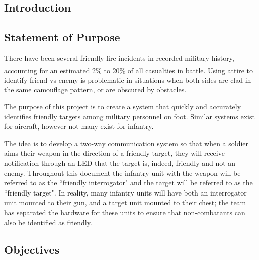 \documentclass[letterpaper,10pt]{article}
\newcommand{\buildtoc}{
	\clearpage
	\singlespacing
	\tableofcontents
	\onehalfspacing
}
\begin{document}
\maketitle
\pagestyle{fancy}
\begin{spacing}{1.15}


\color{black}
\buildtoc
{}
\clearpage
\setcounter{page}{1}

\section{Introduction}
\subsection{Statement of Purpose}
There have been several friendly fire incidents in recorded military history, accounting for an estimated 2\% to 20\% of all casualties in battle\textsuperscript{\cite{USArmy}}. Using attire to identify friend vs enemy is problematic in situations when both sides are clad in the same camouflage pattern, or are obscured by obstacles.

The purpose of this project is to create a system that quickly and accurately identifies friendly targets among military personnel on foot. Similar systems exist for aircraft, however not many exist for infantry.

The idea is to develop a two-way communication system so that when a soldier aims their weapon in the direction of a friendly target, they will receive notification through an LED that the target is, indeed, friendly and not an enemy. Throughout this document the infantry unit with the weapon will be referred to as the ``friendly interrogator" and the target will  be referred to as the ``friendly target". In reality, many infantry units will have both an interrogator unit mounted to their gun, and a target unit mounted to their chest; the team has separated the hardware for these units to ensure that non-combatants can also be identified as friendly. 

\subsection{Objectives}

\end{spacing}
\end{document}
